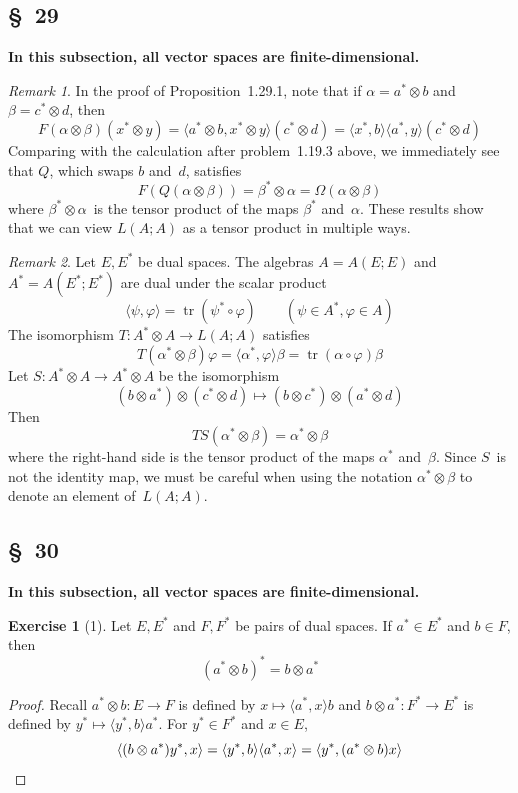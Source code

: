 \documentclass[letterpaper,12pt]{article}
\DeclareMathOperator{\tr}{tr}
\newcommand{\after}{\circ}
\newcommand{\tprod}{\otimes}
\newcommand{\sprod}[2]{\langle#1,#2\rangle}
\theoremstyle{definition}
\newtheorem*{exer}{Exercise}
\theoremstyle{remark}
\newtheorem*{rmk}{Remark}
\begin{document}
\subsection*{\S~29}
\textbf{In this subsection, all vector spaces are finite-dimensional.}

\begin{rmk}
In the proof of Proposition~1.29.1, note that if \(\alpha=a^*\tprod b\) and \(\beta=c^*\tprod d\), then
\[F(\alpha\tprod\beta)(x^*\tprod y)=\sprod{a^*\tprod b}{x^*\tprod y}(c^*\tprod d)=\sprod{x^*}{b}\sprod{a^*}{y}(c^*\tprod d)\]
Comparing with the calculation after problem~1.19.3 above, we immediately see that \(Q\), which swaps \(b\) and~\(d\), satisfies
\[F(Q(\alpha\tprod\beta))=\beta^*\tprod\alpha=\Omega(\alpha\tprod\beta)\]
where \(\beta^*\tprod\alpha\)~is the tensor product of the maps \(\beta^*\) and~\(\alpha\). These results show that we can view \(L(A;A)\) as a tensor product in multiple ways.
\end{rmk}

\begin{rmk}
Let \(E,E^*\) be dual spaces. The algebras \(A=A(E;E)\) and \(A^*=A(E^*;E^*)\) are dual under the scalar product
\[\sprod{\psi}{\varphi}=\tr(\psi^*\after\varphi)\qquad(\psi\in A^*,\varphi\in A)\]
The isomorphism \(T:A^*\tprod A\to L(A;A)\) satisfies
\[T(\alpha^*\tprod\beta)\varphi=\sprod{\alpha^*}{\varphi}\beta=\tr(\alpha\after\varphi)\beta\]
Let \(S:A^*\tprod A\to A^*\tprod A\) be the isomorphism
\[(b\tprod a^*)\tprod(c^*\tprod d)\mapsto(b\tprod c^*)\tprod(a^*\tprod d)\]
Then
\[TS(\alpha^*\tprod\beta)=\alpha^*\tprod\beta\]
where the right-hand side is the tensor product of the maps \(\alpha^*\) and~\(\beta\). Since \(S\)~is not the identity map, we must be careful when using the notation \(\alpha^*\tprod\beta\) to denote an element of~\(L(A;A)\).
\end{rmk}

\subsection*{\S~30}
\textbf{In this subsection, all vector spaces are finite-dimensional.}

\begin{exer}[1]
Let \(E,E^*\) and \(F,F^*\) be pairs of dual spaces. If \(a^*\in E^*\) and \(b\in F\), then
\[(a^*\tprod b)^*=b\tprod a^*\]
\end{exer}
\begin{proof}
Recall \(a^*\tprod b:E\to F\) is defined by \(x\mapsto\sprod{a^*}{x}b\) and \(b\tprod a^*:F^*\to E^*\) is defined by \(y^*\mapsto\sprod{y^*}{b}a^*\). For \(y^*\in F^*\) and \(x\in E\),
\[\sprod{(b\tprod a^*)y^*}{x}=\sprod{y^*}{b}\sprod{a^*}{x}=\sprod{y^*}{(a^*\tprod b)x}\qedhere\]
\end{proof}
\end{document}
